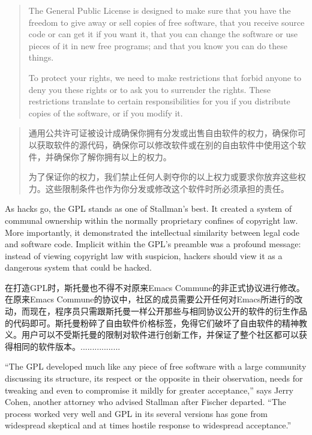 \ifdefined\eng
\begin{quote}
The General Public License is designed to make sure that you have the freedom to give away or sell copies of free software, that you receive source code or can get it if you want it, that you can change the software or use pieces of it in new free programs; and that you know you can do these things.

To protect your rights, we need to make restrictions that forbid anyone to deny you these rights or to ask you to surrender the rights. These restrictions translate to certain responsibilities for you if you distribute copies of the software, or if you modify it.
\end{quote}
\fi

\ifdefined\chs
\begin{quote}
通用公共许可证被设计成确保你拥有分发或出售自由软件的权力，确保你可以获取软件的源代码，确保你可以修改软件或在别的自由软件中使用这个软件，并确保你了解你拥有以上的权力。

为了保证你的权力，我们禁止任何人剥夺你的以上权力或要求你放弃这些权力。这些限制条件也作为你分发或修改这个软件时所必须承担的责任。

\end{quote}
\fi

\ifdefined\eng
As hacks go, the GPL stands as one of Stallman's best. It created a system of communal ownership within the normally proprietary confines of copyright law. More importantly, it demonstrated the intellectual similarity between legal code and software code. Implicit within the GPL's preamble was a profound message: instead of viewing copyright law with suspicion, hackers should view it as a dangerous system that could be hacked.
\fi

\ifdefined\chs
在打造GPL时，斯托曼也不得不对原来Emacs Commune的非正式协议进行修改。在原来Emacs Commune的协议中，社区的成员需要公开任何对Emacs所进行的改动，而现在，程序员只需跟斯托曼一样公开那些与相同协议公开的软件的衍生作品的代码即可。斯托曼粉碎了自由软件价格标签，免得它们破坏了自由软件的精神教义。用户可以不受斯托曼的限制对软件进行创新工作，并保证了整个社区都可以获得相同的软件版本。.................
\fi

\ifdefined\eng
``The GPL developed much like any piece of free software with a large community discussing its structure, its respect or the opposite in their observation, needs for tweaking and even to compromise it mildly for greater acceptance,'' says Jerry Cohen, another attorney who advised Stallman after Fischer departed. ``The process worked very well and GPL in its several versions has gone from widespread skeptical and at times hostile response to widespread acceptance.''
\fi

